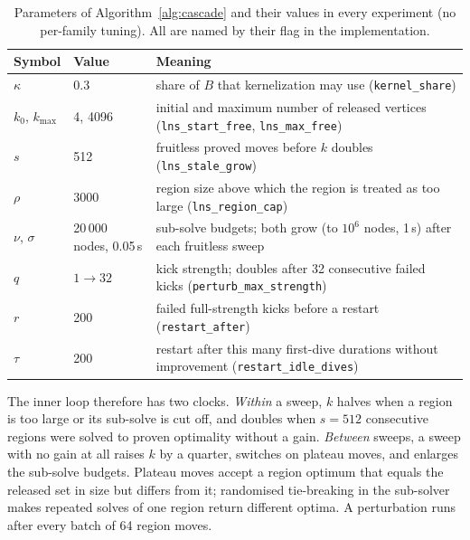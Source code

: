 \documentclass[review,authoryear,11pt]{elsarticle}
\theoremstyle{definition}
\begin{document}
\begin{table}[htbp]
\centering
\caption{Parameters of Algorithm~\ref{alg:cascade} and their values in every
experiment (no per-family tuning). All are named by their flag in the
implementation.}
\label{tab:params}
\small
\begin{tabular}{llp{7.2cm}}
\toprule
Symbol & Value & Meaning \\
\midrule
$\kappa$ & 0.3 & share of $B$ that kernelization may use (\texttt{kernel\_share}) \\
$k_0$, $k_{\max}$ & 4, 4096 & initial and maximum number of released vertices (\texttt{lns\_start\_free}, \texttt{lns\_max\_free}) \\
$s$ & 512 & fruitless proved moves before $k$ doubles (\texttt{lns\_stale\_grow}) \\
$\rho$ & 3000 & region size above which the region is treated as too large (\texttt{lns\_region\_cap}) \\
$\nu$, $\sigma$ & 20\,000 nodes, 0.05\,s & sub-solve budgets; both grow (to $10^6$ nodes, 1\,s) after each fruitless sweep \\
$q$ & $1\to 32$ & kick strength; doubles after 32 consecutive failed kicks (\texttt{perturb\_max\_strength}) \\
$r$ & 200 & failed full-strength kicks before a restart (\texttt{restart\_after}) \\
$\tau$ & 200 & restart after this many first-dive durations without improvement (\texttt{restart\_idle\_dives}) \\
\bottomrule
\end{tabular}
\end{table}

The inner loop therefore has two clocks. \emph{Within} a sweep, $k$ halves when
a region is too large or its sub-solve is cut off, and doubles when $s=512$
consecutive regions were solved to proven optimality without a gain. \emph{Between}
sweeps, a sweep with no gain at all raises $k$ by a quarter, switches on
plateau moves, and enlarges the sub-solve budgets. Plateau moves accept a region
optimum that equals the released set in size but differs from it; randomised
tie-breaking in the sub-solver makes repeated solves of one region return
different optima. A perturbation runs after every batch of 64 region moves.
\end{document}
